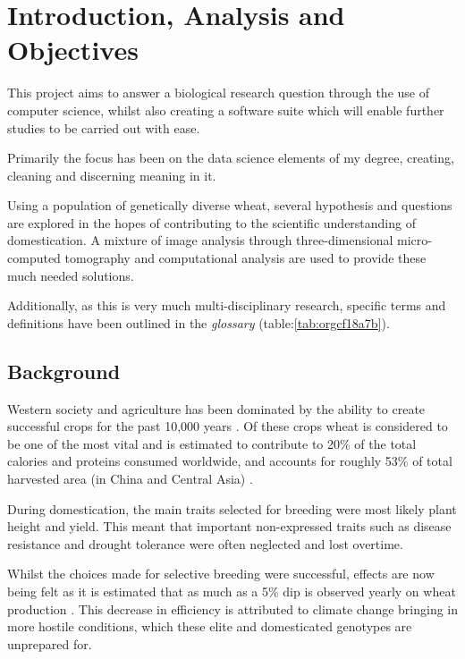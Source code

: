 \documentclass[11pt]{report}
\begin{document}
\chapter{Introduction, Analysis and Objectives}
\label{sec:orgb19942e}

This project aims to answer a biological research question through the use of computer science, whilst also creating a software suite which will enable further studies to be carried out with ease.

Primarily the focus has been on the data science elements of my degree, creating, cleaning and discerning meaning in it.

Using a population of genetically diverse wheat, several hypothesis and questions are explored in the hopes of contributing to the scientific understanding of domestication. A mixture of image analysis through three-dimensional micro-computed tomography and computational analysis are used to provide these much needed solutions.

Additionally, as this is very much multi-disciplinary research, specific terms and definitions have been outlined in the \emph{glossary} (table:\ref{tab:orgcf18a7b}).

\section{Background}
\label{sec:org9930395}

Western society and agriculture has been dominated by the ability to create successful crops for the past 10,000 years \cite{Ozkan2002}. Of these crops wheat is considered to be one of the most vital and is estimated to contribute to 20\% of the total calories and proteins consumed worldwide, and accounts for roughly 53\% of total harvested area (in China and Central Asia) \cite{Shiferaw2013}.

During domestication, the main traits selected for breeding were most likely plant height and yield. This meant that important non-expressed traits such as disease resistance and drought tolerance were often neglected and lost overtime.

Whilst the choices made for selective breeding were successful, effects are now being felt as it is estimated that as much as a 5\% dip is observed yearly on wheat production \cite{Shiferaw2013}. This decrease in efficiency is attributed to climate change bringing in more hostile conditions, which these elite and  domesticated genotypes are unprepared for.
\end{document}
